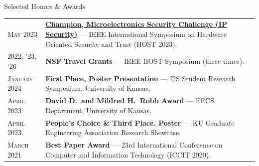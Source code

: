 \begin{rSection}{Selected Honors \& Awards}

\begin{tabular}{lp{15.6cm}}
    \textsc{May 2023} & \href{http://www.hostsymposium.org/host_2023awards.php}{\textbf{Champion, Microelectronics Security Challenge (IP Security)}} --- IEEE International Symposium on Hardware Oriented Security and Trust (HOST 2023). \\

    \textsc{2022, '23, '26} & \textbf{NSF Travel Grants} --- IEEE HOST Symposium (three times). \\

    \textsc{January 2024} & \textbf{First Place, Poster Presentation} --- I2S Student Research Symposium, University of Kansas. \\

    \textsc{April 2023} & \textbf{David D.\ and Mildred H.\ Robb Award} --- EECS Department, University of Kansas. \\

    \textsc{April 2023} & \textbf{People's Choice \& Third Place, Poster} --- KU Graduate Engineering Association Research Showcase. \\

    \textsc{March 2021} & \textbf{Best Paper Award} --- 23rd International Conference on Computer and Information Technology (ICCIT 2020). \\
\end{tabular}

\end{rSection}
